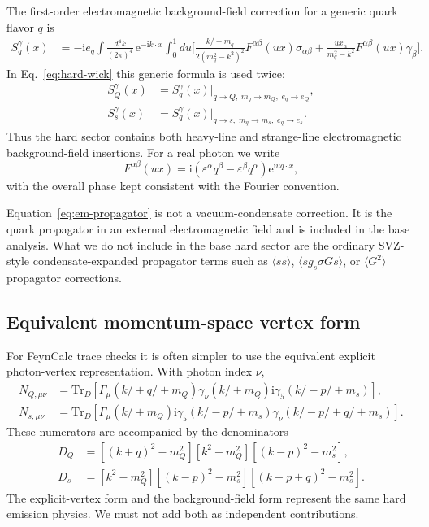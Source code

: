 \documentclass[11pt]{article}
\newcommand{\ii}{\mathrm{i}}
\newcommand{\ee}{\mathrm{e}}
\newcommand{\Tr}{\mathrm{Tr}}
\newcommand{\slashp}[1]{#1\!\!\!/}
\begin{document}
The first-order electromagnetic background-field correction for a generic quark
flavor $q$ is
\begin{align}
  S_q^\gamma(x)
  &=
  -\ii e_q
  \int\frac{d^4k}{(2\pi)^4}\,\ee^{-\ii k\cdot x}
  \int_0^1du
  \Bigg[
    \frac{\slashp{k}+m_q}{2(m_q^2-k^2)^2}
    F^{\alpha\beta}(ux)\sigma_{\alpha\beta}
    +
    \frac{u x_\alpha}{m_q^2-k^2}
    F^{\alpha\beta}(ux)\gamma_\beta
  \Bigg].
  \label{eq:em-propagator}
\end{align}
In Eq.~\eqref{eq:hard-wick} this generic formula is used twice:
\begin{align}
  S_Q^\gamma(x)
  &= S_q^\gamma(x)\big|_{q\to Q,\;m_q\to m_Q,\;e_q\to e_Q},\\
  S_s^\gamma(x)
  &= S_q^\gamma(x)\big|_{q\to s,\;m_q\to m_s,\;e_q\to e_s}.
\end{align}
Thus the hard sector contains both heavy-line and strange-line electromagnetic
background-field insertions.
For a real photon we write
\begin{equation}
  F^{\alpha\beta}(ux)
  =
  \ii(\varepsilon^\alpha q^\beta-\varepsilon^\beta q^\alpha)
  \ee^{\ii u q\cdot x},
\end{equation}
with the overall phase kept consistent with the Fourier convention.

Equation~\eqref{eq:em-propagator} is not a vacuum-condensate correction.  It is
the quark propagator in an external electromagnetic field and is included in
the base analysis.  What we do not include in the base hard sector are the
ordinary SVZ-style condensate-expanded propagator terms such as
$\langle\bar s s\rangle$, $\langle\bar s g_s\sigma Gs\rangle$, or
$\langle G^2\rangle$ propagator corrections.

\subsection{Equivalent momentum-space vertex form}

For FeynCalc trace checks it is often simpler to use the equivalent explicit
photon-vertex representation.  With photon index $\nu$,
\begin{align}
  N_{Q,\mu\nu}
  &=
  \Tr_D\!\left[
    \Gamma_\mu
    (\slashp{k}+\slashp{q}+m_Q)
    \gamma_\nu
    (\slashp{k}+m_Q)
    \ii\gamma_5
    (\slashp{k}-\slashp{p}+m_s)
  \right],
  \\
  N_{s,\mu\nu}
  &=
  \Tr_D\!\left[
    \Gamma_\mu
    (\slashp{k}+m_Q)
    \ii\gamma_5
    (\slashp{k}-\slashp{p}+m_s)
    \gamma_\nu
    (\slashp{k}-\slashp{p}+\slashp{q}+m_s)
  \right].
\end{align}
These numerators are accompanied by the denominators
\begin{align}
  D_Q &=
  [(k+q)^2-m_Q^2][k^2-m_Q^2][(k-p)^2-m_s^2],\\
  D_s &=
  [k^2-m_Q^2][(k-p)^2-m_s^2][(k-p+q)^2-m_s^2].
\end{align}
The explicit-vertex form and the background-field form represent the same hard
emission physics.  We must not add both as independent contributions.
\end{document}
